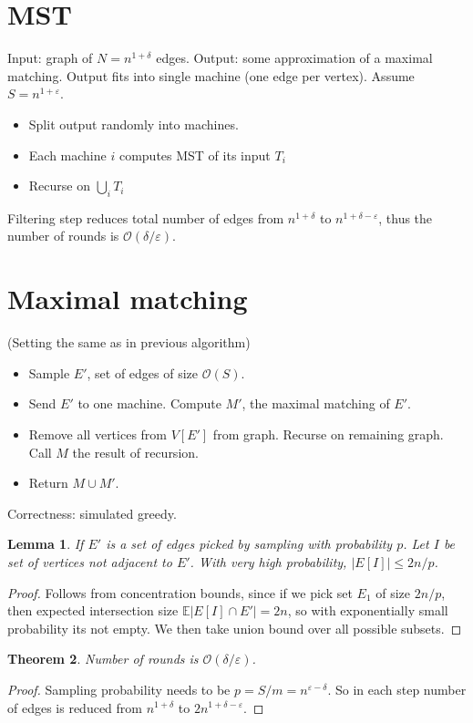 \documentclass[11pt]{article}
\newtheorem{theorem}{Theorem}
\newtheorem{lemma}[theorem]{Lemma}
\newcommand{\bigo}{\mathcal{O}}
\begin{document}
\section{MST \cite{DBLP:conf/spaa/Pandurangan0S16}}
Input: graph of $N = n^{1+\delta}$ edges. Output: some approximation of a maximal matching. Output fits into single machine (one edge per vertex). Assume $S = n^{1+\varepsilon}$.
\begin{itemize}
\item Split output randomly into machines.
\item Each machine $i$ computes MST of its input $T_i$
\item Recurse on $\bigcup_i T_i$
\end{itemize}

Filtering step reduces total number of edges from $n^{1+\delta}$ to $n^{1+\delta-\varepsilon}$, thus the number of rounds is $\bigo(\delta/\varepsilon)$.


\section{Maximal matching \cite{DBLP:conf/focs/BehnezhadHH19}}
(Setting the same as in previous algorithm)

\begin{itemize}
\item Sample $E'$, set of edges of size $\bigo(S)$. 
\item Send $E'$ to one machine. Compute $M'$, the maximal matching of $E'$.
\item Remove all vertices from $V[E']$ from graph. Recurse on remaining graph. Call $M$ the result of recursion.
\item Return $M \cup M'$.
\end{itemize}

Correctness: simulated greedy. 
\begin{lemma}If $E'$ is a set of edges picked by sampling with probability $p$. Let $I$ be set of vertices not adjacent to $E'$. With very high probability, $|E[I]| \le 2n/p$. 
\end{lemma}
\begin{proof}
Follows from concentration bounds, since if we pick set $E_1$ of size $2n/p$, then expected intersection size $\mathbb{E} | E[I] \cap E' | = 2n$, so with exponentially small probability its not empty. We then take union bound over all possible subsets.
\end{proof}
\begin{theorem}
Number of rounds is $\bigo(\delta/\varepsilon)$.
\end{theorem}
\begin{proof}
Sampling probability needs to be $p = S/m = n^{\varepsilon-\delta}$. So in each step number of edges is reduced from $n^{1+\delta}$ to $2n^{1+\delta-\varepsilon}$.
\end{proof}
\end{document}

